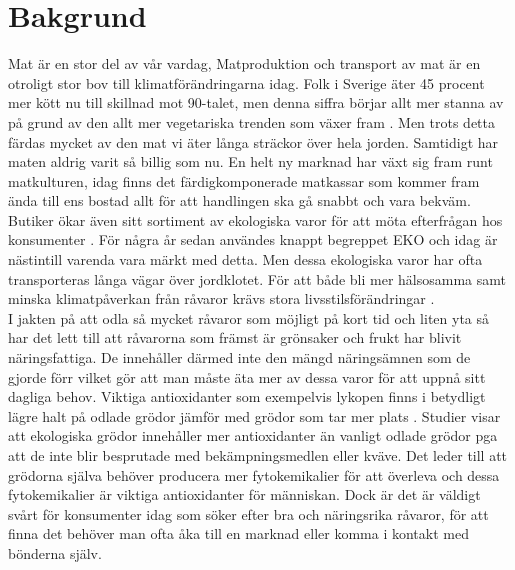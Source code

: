 \documentclass[10pt,a4paper,oneside]{article}
\begin{document}
\section{Bakgrund}
Mat är en stor del av vår vardag, Matproduktion och transport av mat är en otroligt stor bov till klimatförändringarna idag. Folk i Sverige äter 45 procent mer kött nu till skillnad mot 90-talet, men denna siffra börjar allt mer stanna av på grund av den allt mer vegetariska trenden som växer fram \cite{N1}. Men trots detta färdas mycket av den mat vi äter långa sträckor över hela jorden. Samtidigt har maten aldrig varit så billig som nu. En helt ny marknad har växt sig fram runt matkulturen, idag finns det färdigkomponerade matkassar som kommer fram ända till ens bostad allt för att handlingen ska gå snabbt och vara bekväm. Butiker ökar även sitt sortiment av ekologiska varor för att möta efterfrågan hos konsumenter \cite{ICA2}. För några år sedan användes knappt begreppet EKO och idag är nästintill varenda vara märkt med detta. Men dessa ekologiska varor har ofta transporteras långa vägar över jordklotet. För att både bli mer hälsosamma samt minska klimatpåverkan från råvaror krävs stora livsstilsförändringar \cite{Jordbruksverket}. \\
 
I jakten på att odla så mycket råvaror som möjligt på kort tid och liten yta så har det lett till att råvarorna som främst är grönsaker och frukt har blivit näringsfattiga. De innehåller därmed inte den mängd näringsämnen som de gjorde förr vilket gör att man måste äta mer av dessa varor för att uppnå sitt dagliga behov. Viktiga antioxidanter som exempelvis lykopen finns i betydligt lägre halt på odlade grödor jämför med grödor som tar mer plats \cite{SR}. Studier visar att ekologiska grödor innehåller mer antioxidanter än vanligt odlade grödor pga att de inte blir besprutade med bekämpningsmedlen eller kväve. Det leder till att grödorna själva behöver producera mer fytokemikalier för att överleva och dessa fytokemikalier är viktiga antioxidanter för människan. Dock är det är väldigt svårt för konsumenter idag som söker efter bra och näringsrika råvaror, för att finna det behöver man ofta åka till en marknad eller komma i kontakt med bönderna själv.\\
 
\end{document}
